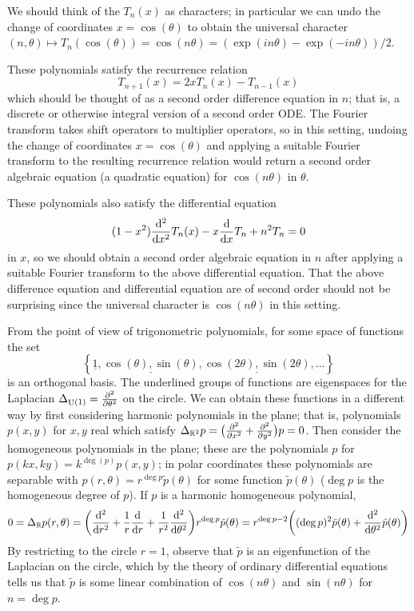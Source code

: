 \documentclass[11pt,leqno]{article}
\theoremstyle{plain}
\theoremstyle{definition}
\numberwithin{equation}{section}
\numberwithin{lem}{section}
\newcommand{\cbr}[1]{\left\{#1\right\}}
\DeclareMathOperator{\U}{U}
\begin{document}
We should think of the $T_n(x)$ as characters; in particular we can undo the change of coordinates $x = \cos(\theta)$ to obtain the universal character $(n,\theta)\mapsto T_n(\cos(\theta)) = \cos(n\theta) = (\exp(in\theta)-\exp(-in\theta))/2$.

These polynomials satisfy the recurrence relation
\[T_{n+1}(x) = 2xT_n(x) - T_{n-1}(x)\]
which should be thought of as a second order difference equation in $n$; that is, a discrete or otherwise integral version of a second order ODE. The Fourier transform takes shift operators to multiplier operators, so in this setting, undoing the change of coordinates $x = \cos(\theta)$ and applying a suitable Fourier transform to the resulting recurrence relation would return a second order algebraic equation (a quadratic equation) for $\cos(n\theta)$ in $\theta$.

These polynomials also satisfy the differential equation
\[(1-x^2)\dv[2]{x}T_n(x)-x\dv{x}T_n+ n^2T_n = 0\]
in $x$, so we should obtain a second order algebraic equation in $n$ after applying a suitable Fourier transform to the above differential equation. That the above difference equation and differential equation are of second order should not be surprising since the universal character is $\cos(n\theta)$ in this setting.

From the point of view of trigonometric polynomials, for some space of functions the set
\[\cbr{\underline{1},\underline{\cos(\theta), \sin(\theta)}, \underline{\cos(2\theta),\sin(2\theta)},\dots}\]
is an orthogonal basis. The underlined groups of functions are eigenspaces for the Laplacian $\Delta_{\U(1)} = \pdv[2]{\theta}$ on the circle. We can obtain these functions in a different way by first considering harmonic polynomials in the plane; that is, polynomials $p(x,y)$ for $x,y$ real which satisfy $\Delta_{\mathbb R^2}p = \bigl(\pdv[2]{x} + \pdv[2]{y}\bigr)p = 0$. Then consider the homogeneous polynomials in the plane; these are the polynomials $p$ for $p(kx,ky) = k^{\deg(p)}p(x,y)$; in polar coordinates these polynomials are separable with $p(r,\theta) = r^{\deg p}\tilde p(\theta)$ for some function $\tilde p(\theta)$ ($\deg p$ is the homogeneous degree of $p$). If $p$ is a harmonic homogeneous polynomial,
\[0 = \Delta_{\mathbb R}p(r,\theta) = \biggl(\dv[2]{r}+\frac{1}{r}\dv{r}+\frac{1}{r^2}\dv[2]{\theta}\biggr)r^{\deg p}\tilde p(\theta) = r^{\deg p - 2}\biggl((\deg p)^2\tilde p(\theta)+\dv[2]{\theta}\tilde p(\theta)\biggr)\]
By restricting to the circle $r = 1$, observe that $\tilde p$ is an eigenfunction of the Laplacian on the circle, which by the theory of ordinary differential equations tells us that $\tilde p$ is some linear combination of $\cos(n\theta)$ and $\sin(n\theta)$ for $n = \deg p$.
\end{document}
